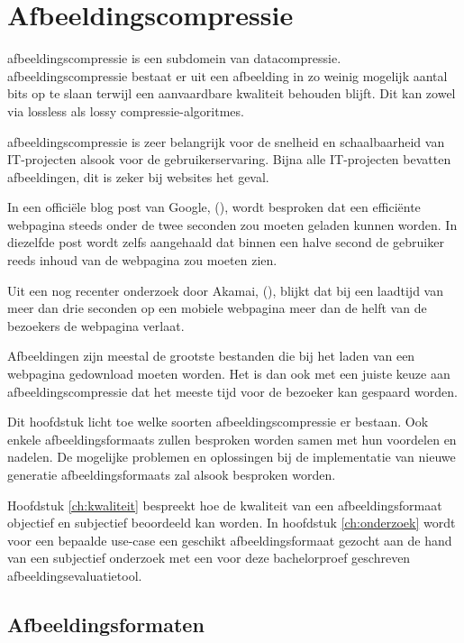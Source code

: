 \chapter{Afbeeldingscompressie}
\label{ch:afbeeldingscompressie}

\Gls{afbeeldingscompressie} is een subdomein van \gls{datacompressie}. \Gls{afbeeldingscompressie} bestaat er uit een afbeelding in zo weinig mogelijk aantal \glspl{bit} op te slaan terwijl een aanvaardbare kwaliteit behouden blijft. Dit kan zowel via \gls{lossless} als \gls{lossy} \glspl{compressie-algoritme}.

\Gls{afbeeldingscompressie} is zeer belangrijk voor de snelheid en schaalbaarheid van IT-projecten alsook voor de gebruikerservaring. Bijna alle IT-projecten bevatten afbeeldingen, dit is zeker bij websites het geval.

In een officiële blog post van Google,  (\cite{googleinternetspeed}), wordt besproken dat een efficiënte webpagina steeds onder de twee seconden zou moeten geladen kunnen worden. In diezelfde post wordt zelfs aangehaald dat binnen een halve second de gebruiker reeds inhoud van de webpagina zou moeten zien.

Uit een nog recenter onderzoek door Akamai,  (\cite{akamaiinternetspeed}), blijkt dat bij een laadtijd van meer dan drie seconden op een mobiele webpagina meer dan de helft van de bezoekers de webpagina verlaat.

Afbeeldingen zijn meestal de grootste bestanden die bij het laden van een webpagina gedownload moeten worden. Het is dan ook met een juiste keuze aan \gls{afbeeldingscompressie} dat het meeste tijd voor de bezoeker kan gespaard worden. 

Dit hoofdstuk licht toe welke soorten \gls{afbeeldingscompressie} er bestaan. Ook enkele \glspl{afbeeldingsformaat} zullen besproken worden samen met hun voordelen en nadelen. De mogelijke problemen en oplossingen bij de implementatie van nieuwe generatie \glspl{afbeeldingsformaat} zal alsook besproken worden.

Hoofdstuk \ref{ch:kwaliteit} bespreekt hoe de kwaliteit van een \gls{afbeeldingsformaat} objectief en subjectief beoordeeld kan worden. In hoofdstuk \ref{ch:onderzoek} wordt voor een bepaalde \gls{use-case} een geschikt \gls{afbeeldingsformaat} gezocht aan de hand van een subjectief onderzoek met een voor deze bachelorproef geschreven \gls{afbeeldingsevaluatietool}.


\section{Afbeeldingsformaten}
\label{sec:afbeeldingscompressie-afbeeldingsformaten}

